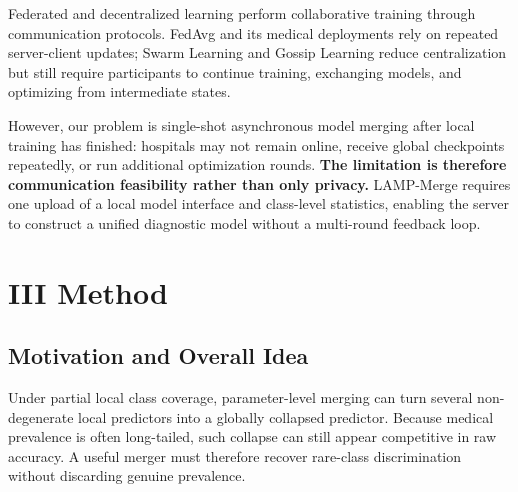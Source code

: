 \documentclass[letterpaper]{article} %
\begin{document}
Federated and decentralized learning perform collaborative training through communication protocols. FedAvg and its medical deployments rely on repeated server-client updates\cite{pmlr-v54-mcmahan17a,li2020fedprox,karimireddy2020scaffold,li2021fedbn,kaissis_secure_2020,sheller2020federated,rieke2020future,kairouz2021advances}; Swarm Learning and Gossip Learning reduce centralization but still require participants to continue training, exchanging models, and optimizing from intermediate states\cite{warnat-herresthal_swarm_2021,hegedhus_gossip_2019}.

However, our problem is single-shot asynchronous model merging after local training has finished: hospitals may not remain online, receive global checkpoints repeatedly, or run additional optimization rounds. \textbf{The limitation is therefore communication feasibility rather than only privacy.} LAMP-Merge requires one upload of a local model interface and class-level statistics, enabling the server to construct a unified diagnostic model without a multi-round feedback loop.

\section{III Method}

\subsection{Motivation and Overall Idea}

Under partial local class coverage, parameter-level merging can turn several non-degenerate local predictors into a globally collapsed predictor. Because medical prevalence is often long-tailed, such collapse can still appear competitive in raw accuracy. A useful merger must therefore recover rare-class discrimination without discarding genuine prevalence.
\end{document}
